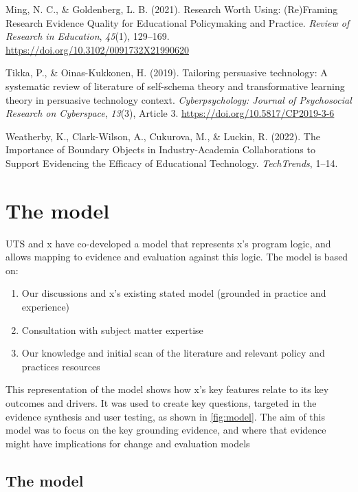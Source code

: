 \documentclass[
]{book}
\providecommand{\tightlist}{%
  \setlength{\itemsep}{0pt}\setlength{\parskip}{0pt}}
\begin{document}
Ming, N. C., \& Goldenberg, L. B. (2021). Research Worth Using:
(Re)Framing Research Evidence Quality for Educational Policymaking and
Practice. \emph{Review of Research in Education}, \emph{45}(1), 129--169.
\url{https://doi.org/10.3102/0091732X21990620}

Tikka, P., \& Oinas-Kukkonen, H. (2019). Tailoring persuasive technology:
A systematic review of literature of self-schema theory and
transformative learning theory in persuasive technology context.
\emph{Cyberpsychology: Journal of Psychosocial Research on Cyberspace},
\emph{13}(3), Article 3. \url{https://doi.org/10.5817/CP2019-3-6}

Weatherby, K., Clark-Wilson, A., Cukurova, M., \& Luckin, R. (2022). The
Importance of Boundary Objects in Industry-Academia Collaborations to
Support Evidencing the Efficacy of Educational Technology. \emph{TechTrends},
1--14.

\hypertarget{the-model}{%
\section{The model}\label{the-model}}

UTS and x have co-developed a model that represents x's program logic, and allows mapping to evidence and evaluation against this logic. The model is based on:

\begin{enumerate}
\def\labelenumi{\arabic{enumi}.}
\tightlist
\item
  Our discussions and x's existing stated model (grounded in practice and experience)
\item
  Consultation with subject matter expertise
\item
  Our knowledge and initial scan of the literature and relevant policy and practices resources
\end{enumerate}

This representation of the model shows how x's key features relate to its key outcomes and drivers. It was used to create key questions, targeted in the evidence synthesis and user testing, as shown in \ref{fig:model}. The aim of this model was to focus on the key grounding evidence, and where that evidence might have implications for change and evaluation models

\hypertarget{the-model-1}{%
\subsection{The model}\label{the-model-1}}
\end{document}
